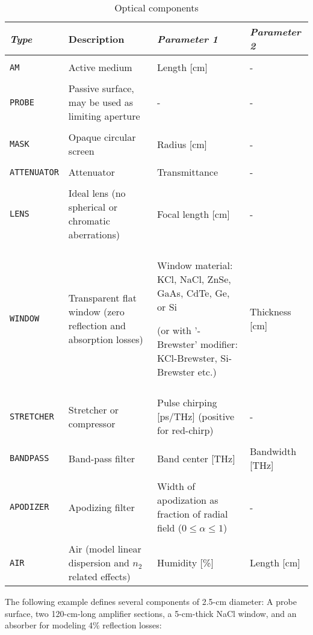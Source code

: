 \documentclass{report}
\begin{document}
\begin{table}
\caption{Optical components}
\label{table:components}
\def\tabularxcolumn#1{m{#1}}
\begin{tabularx}{\textwidth}{|l|X|X|X|}
\hline 
\textit{\textbf{Type}} & Description & \textit{\textbf{Parameter 1}} & \textit{\textbf{Parameter 2}} \\
\hline 
&&&\\
\texttt{AM}	& Active medium	& Length [cm]	& - \\
&&&\\
\texttt{PROBE} & Passive surface, may be used as limiting aperture &	- &	-\\
&&&\\
\texttt{MASK} & Opaque circular screen & Radius [cm] & -\\
&&&\\
\texttt{ATTENUATOR} & Attenuator & Transmittance & -\\
&&&\\
\texttt{LENS} & Ideal lens (no spherical or chromatic aberrations)& Focal length [cm]& -\\
&&&\\
\texttt{WINDOW} & Transparent flat window (zero reflection and absorption losses) & Window material: KCl, NaCl, ZnSe, GaAs, CdTe, Ge, or Si

(or with '-Brewster' modifier: KCl-Brewster, Si-Brewster etc.) & Thickness [cm]\\
&&&\\
\texttt{STRETCHER} & Stretcher or compressor & Pulse chirping [ps/THz] (positive for red-chirp) & -\\
&&&\\
\texttt{BANDPASS} & Band-pass filter & Band center [THz] & Bandwidth [THz]\\
&&&\\
\texttt{APODIZER} & Apodizing filter & Width of apodization as fraction of radial field (${0\leq\alpha\leq1}$) & -\\
&&&\\
\texttt{AIR} & Air (model linear dispersion and $n_2$ related effects) & Humidity [\%] & Length [cm]\\
\hline
\end{tabularx}
\end{table}


The following example defines several components of 2.5-cm diameter: A probe surface, two 120-cm-long amplifier sections, a 5-cm-thick NaCl window, and an absorber for modeling 4\% reflection losses:
\end{document}

